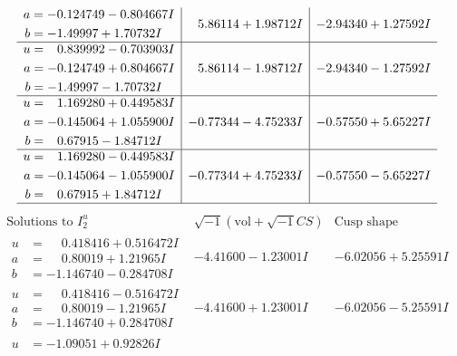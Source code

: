 \documentclass[1p]{elsarticle_modified}
\theoremstyle{definition}
\newcommand{\I}{\sqrt{-1}}
\begin{document}
$$\begin{array}{c|c|c}
\begin{aligned}
a &= -0.124749 - 0.804667 I \\
b &= -1.49997 + 1.70732 I\end{aligned}
 & \phantom{-}5.86114 + 1.98712 I & -2.94340 + 1.27592 I \\ \hline\begin{aligned}
u &= \phantom{-}0.839992 - 0.703903 I \\
a &= -0.124749 + 0.804667 I \\
b &= -1.49997 - 1.70732 I\end{aligned}
 & \phantom{-}5.86114 - 1.98712 I & -2.94340 - 1.27592 I \\ \hline\begin{aligned}
u &= \phantom{-}1.169280 + 0.449583 I \\
a &= -0.145064 + 1.055900 I \\
b &= \phantom{-}0.67915 - 1.84712 I\end{aligned}
 & -0.77344 - 4.75233 I & -0.57550 + 5.65227 I \\ \hline\begin{aligned}
u &= \phantom{-}1.169280 - 0.449583 I \\
a &= -0.145064 - 1.055900 I \\
b &= \phantom{-}0.67915 + 1.84712 I\end{aligned}
 & -0.77344 + 4.75233 I & -0.57550 - 5.65227 I\\
 \hline 
 \end{array}$$\newpage$$\begin{array}{c|c|c}  
\text{Solutions to }I^u_{2}& \I (\text{vol} + \sqrt{-1}CS) & \text{Cusp shape}\\
 \hline 
\begin{aligned}
u &= \phantom{-}0.418416 + 0.516472 I \\
a &= \phantom{-}0.80019 + 1.21965 I \\
b &= -1.146740 - 0.284708 I\end{aligned}
 & -4.41600 - 1.23001 I & -6.02056 + 5.25591 I \\ \hline\begin{aligned}
u &= \phantom{-}0.418416 - 0.516472 I \\
a &= \phantom{-}0.80019 - 1.21965 I \\
b &= -1.146740 + 0.284708 I\end{aligned}
 & -4.41600 + 1.23001 I & -6.02056 - 5.25591 I \\ \hline\begin{aligned}
u &= -1.09051 + 0.92826 I \\

\end{aligned}
\end{array}$$
\end{document}
